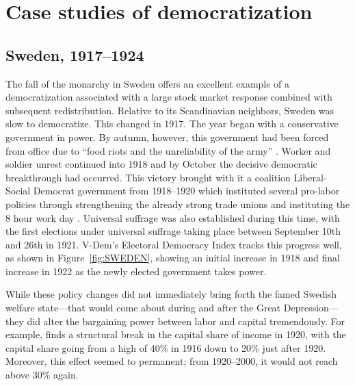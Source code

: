 
\section{Case studies of democratization}\label{section:case_studies}

\subsection{Sweden, 1917--1924}\label{section:SWEDEN}

The fall of the monarchy in Sweden offers an excellent example of a democratization associated with a large stock market response combined with subsequent redistribution. Relative to its Scandinavian neighbors, Sweden was slow to democratize. This changed in 1917. The year began with a conservative government in power. By autumn, however, this government had been forced from office due to ``food riots and the unreliability of the army'' \citep{Luebbert1991}. Worker and soldier unrest continued into 1918 and by October the decisive democratic breakthrough had occurred.  This victory brought with it a coalition Liberal-Social Democrat government from 1918--1920 which instituted several pro-labor policies through strengthening the already strong trade unions and instituting the 8 hour work day \citep{Bengtsson2014}. Universal suffrage was also established during this time, with the first elections under universal suffrage taking place between September 10th and 26th in 1921. V-Dem's Electoral Democracy Index tracks this progress well, as shown in Figure~\ref{fig:SWEDEN}, showing an initial increase in 1918 and final increase in 1922 as the newly elected government takes power.

While these policy changes did not immediately bring forth the famed Swedish welfare state---that would come about during and after the Great Depression---they did alter the bargaining power between labor and capital tremendously. For example, \cite{Bengtsson2014} finds a structural break in the capital share of income in 1920, with the capital share going from a high of 40\% in 1916 down to 20\% just after 1920. Moreover, this effect seemed to permanent; from 1920--2000, it would not reach above 30\% again.



